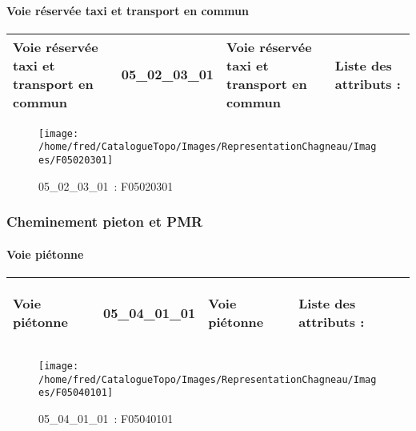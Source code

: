 \documentclass[12pt,titlepage,oneside]{book}
\begin{document}
\paragraph{Voie réservée taxi et transport en commun}
\noindent
\vspace{\baselineskip}

\renewcommand{\arraystretch}{1.2}
\begin{supertabular}{|p{10cm}|c|p{13cm}|p{12cm}|}
 Voie réservée taxi et transport en commun & 05\_02\_03\_01 & Voie réservée taxi et transport en commun & Liste des attributs :
\begin{enumerate}
\end{enumerate}
\\
\hline
\end{supertabular}
\begin{figure}[h!]
  \hfill         %
  \begin{minipage}[t]{3cm}
    \begin{center}
      \texttt{[image: /home/fred/CatalogueTopo/Images/RepresentationChagneau/Images/F05020301]}
      \caption[~05\_02\_03\_01]{\small{05\_02\_03\_01~:} \tiny{F05020301}}\label{F05020301}
    \end{center}
  \end{minipage}
\end{figure}

\subsubsection{\large Cheminement pieton et PMR}
\paragraph{Voie piétonne}
\noindent
\vspace{\baselineskip}

\renewcommand{\arraystretch}{1.2}
\begin{supertabular}{|p{10cm}|c|p{13cm}|p{12cm}|}
 Voie piétonne & 05\_04\_01\_01 & Voie piétonne & Liste des attributs :
\begin{enumerate}
\end{enumerate}
\\
\hline
\end{supertabular}
\begin{figure}[h!]
  \hfill         %
  \begin{minipage}[t]{3cm}
    \begin{center}
      \texttt{[image: /home/fred/CatalogueTopo/Images/RepresentationChagneau/Images/F05040101]}
      \caption[~05\_04\_01\_01]{\small{05\_04\_01\_01~:} \tiny{F05040101}}\label{F05040101}
    \end{center}
  \end{minipage}
\end{figure}
\end{document}
